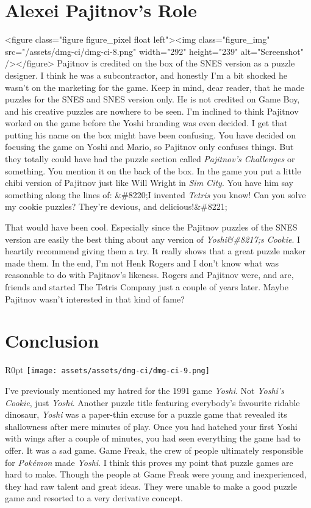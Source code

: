 \documentclass{book}
\begin{document}
\FloatBarrier\needspace{10mm}\section*{Alexei Pajitnov’s Role}\nopagebreak[4]

<figure class="figure figure_pixel float left"><img class="figure_img" src="/assets/dmg-ci/dmg-ci-8.png" width="292" height="239" alt="Screenshot" /></figure>
Pajitnov is credited on the box of the SNES version as a puzzle designer. I think he was a subcontractor, and honestly I’m a bit shocked he wasn’t on the marketing for the game. Keep in mind, dear reader, that he made puzzles for the SNES and SNES version only. He is not credited on Game Boy, and his creative puzzles are nowhere to be seen. I’m inclined to think Pajitnov worked on the game before the Yoshi branding was even decided. I get that putting his name on the box might have been confusing. You have decided on focusing the game on Yoshi and Mario, so Pajitnov only confuses things. But they totally could have had the puzzle section called \emph{Pajitnov’s Challenges} or something. You mention it on the back of the box. In the game you put a little chibi version of Pajitnov just like Will Wright in \emph{Sim City}. You have him say something along the lines of: &\#8220;I invented \emph{Tetris} you know! Can you solve my cookie puzzles? They’re devious, and delicious!&\#8221;

That would have been cool. Especially since the Pajitnov puzzles of the SNES version are easily the best thing about any version of \emph{Yoshi&\#8217;s Cookie}. I heartily recommend giving them a try. It really shows that a great puzzle maker made them. In the end, I’m not Henk Rogers and I don’t know what was reasonable to do with Pajitnov’s likeness. Rogers and Pajitnov were, and are, friends and started The Tetris Company just a couple of years later. Maybe Pajitnov wasn’t interested in that kind of fame?

\FloatBarrier\needspace{10mm}\section*{Conclusion}\nopagebreak[4]

\begin{wrapfigure}{R}{0pt} \texttt{[image: assets/assets/dmg-ci/dmg-ci-9.png]}\end{wrapfigure}
I’ve previously mentioned my hatred for the 1991 game \emph{Yoshi}. Not \emph{Yoshi’s Cookie}, just \emph{Yoshi}. Another puzzle title featuring everybody’s favourite ridable dinosaur, \emph{Yoshi} was a paper-thin excuse for a puzzle game that revealed its shallowness after mere minutes of play. Once you had hatched your first Yoshi with wings after a couple of minutes, you had seen everything the game had to offer. It was a sad game. Game Freak, the crew of people ultimately responsible for \emph{Pokémon} made \emph{Yoshi}. I think this proves my point that puzzle games are hard to make. Though the people at Game Freak were young and inexperienced, they had raw talent and great ideas. They were unable to make a good puzzle game and resorted to a very derivative concept.
\end{document}
